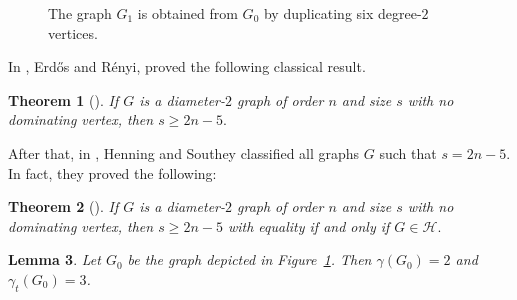 \documentclass[12pt]{amsart}
\theoremstyle{plain}
\newtheorem{theorem}{Theorem}[section]
\newtheorem{lemma}[theorem]{Lemma}
\theoremstyle{definition}
\begin{document}
\begin{figure}[H]
\caption{The graph $G_1$ is obtained from $G_0$ by duplicating six degree-$2$ vertices.}
\label{fig:graph of diam 2;cycle 0f length $5$ and its duplication}	
\end{figure}	
In \cite{ERDOS-RENYEL}, Erd\H{o}s and R\'{e}nyi, proved the following classical result.
\begin{theorem}[\cite{ERDOS-RENYEL}]\label{Thm: s geq 2n-5, by ERDOS-RENYEL}
If $G$ is a diameter-$2$ graph of order $n$ and size $s$ with no dominating vertex, then $s\geq 2n-5.$
\end{theorem}
After that, in \cite{Henning-Michael}, Henning and Southey classified all graphs $G$ such that $s=2n-5.$ In fact, they proved the following:
\begin{theorem}[\cite{Henning-Michael}]\label{thm H-M: dim2 m  geq 2n-5}
If $G$ is a diameter-$2$ graph of order $n$ and size $s$ with no dominating vertex, then $s\geq 2n-5$ with equality if and only if $G\in\mathcal{H}.$ 
\end{theorem}
\begin{lemma}\label{Lemma:DomiOfGamma0Is2ButTDIs3}
Let $G_0$ be the graph depicted in Figure~\ref{fig:graph of diam 2;cycle 0f length $5$ and its duplication}. Then $\gamma(G_0)=2$ and $\gamma_t(G_0)=3$.     
\end{lemma}
\end{document}
